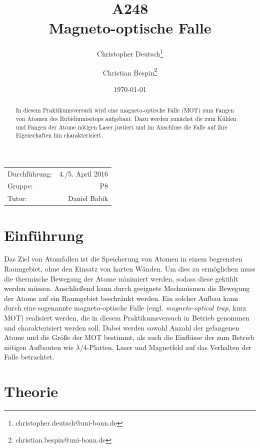 \documentclass[11pt, a4paper]{article}
\title{A248 \\ Magneto-optische Falle}
\author{Christopher Deutsch\footnote{christopher.deutsch@uni-bonn.de} \and Christian Bespin\footnote{christian.bespin@uni-bonn.de}}
\date{\today}
\numberwithin{equation}{section}
\begin{document}
\begin{titlepage}

\maketitle

\begin{center}
\begin{tabular}{l r}
Durchführung: & 4./5. April 2016 \\
Gruppe: & P8 \\
Tutor: & Daniel Babik
\end{tabular}
\end{center}

\begin{abstract}
\noindent In diesem Praktikumsversuch wird eine magneto-optische Falle (MOT) zum Fangen von Atomen des Rubidiumisotops  aufgebaut. Dazu werden zunächst die zum Kühlen und Fangen der Atome nötigen Laser justiert und im Anschluss die Falle auf ihre Eigenschaften hin charakterisiert.
\end{abstract}

\end{titlepage}

\tableofcontents
\newpage

\section{Einführung}

Das Ziel von Atomfallen ist die Speicherung von Atomen in einem begrenzten Raumgebiet, ohne den Einsatz von harten Wänden.
Um dies zu ermöglichen muss die thermische Bewegung der Atome minimiert werden, sodass diese gekühlt werden müssen.
Anschließend kann durch geeignete Mechanismen die Bewegung der Atome auf ein Raumgebiet beschränkt werden.
Ein solcher Aufbau kann durch eine sogenannte magneto-optische Falle (engl.\emph{ magneto-optical trap}, kurz MOT) realisiert werden, die in diesem Praktikumsversuch in Betrieb genommen und charakterisiert werden soll.
Dabei werden sowohl Anzahl der gefangenen Atome und die Größe der MOT bestimmt, als auch die Einflüsse der zum Betrieb nötigen Aufbauten wie $\lambda/4$-Platten, Laser und Magnetfeld auf das Verhalten der Falle betrachtet.

\section{Theorie}
\end{document}
